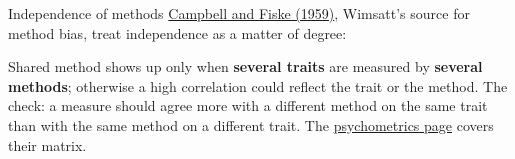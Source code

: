 \documentclass[aspectratio=169,11pt]{beamer}
\begin{document}
\begin{frame}[label=cf]{Independence of methods}
\href{https://www.ovid.com/journals/plbul/fulltext/00006823-195903000-00001~convergent-and-discriminant-validation-by-the}{Campbell and Fiske (1959)}, Wimsatt's source for method bias, treat independence as a matter of degree:

\vspace{0.3em}
\begin{center}
\end{center}

\vspace{0.2em}
{\small Shared method shows up only when \textbf{several traits} are measured by \textbf{several methods}; otherwise a high correlation could reflect the trait or the method. The check: a measure should agree more with a different method on the same trait than with the same method on a different trait. The \href{https://measuring-introspection.github.io/measuring-introspection/foundations/psychometrics/}{psychometrics page} covers their matrix.}
\end{frame}
\end{document}
